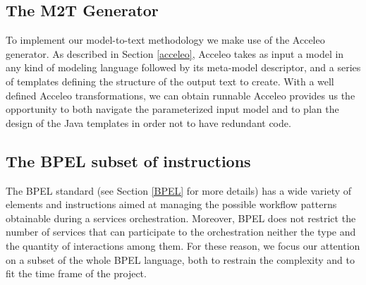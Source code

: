 
\subsection{The M2T Generator}
To implement our model-to-text methodology we make use of the Acceleo generator. As described in Section \ref{acceleo}, Acceleo takes as input a model in any kind of modeling language followed by its meta-model descriptor, and a series of templates defining the structure of the output text to create.
With a well defined Acceleo transformations, we can obtain runnable 
Acceleo provides us the opportunity to both navigate the parameterized input model and to plan the design of the Java templates in order not to have redundant code.
\subsection{The BPEL subset of instructions}
\label{Sec:BPELsubset}
The BPEL standard (see Section \ref{BPEL} for more details) has a wide variety of elements and instructions aimed at managing the possible workflow patterns obtainable during a services orchestration. Moreover, BPEL does not restrict the number of services that can participate to the orchestration neither the type and the quantity of interactions among them.
For these reason, we focus our attention on a subset of the whole BPEL language, both to restrain the complexity and to fit the time frame of the project.
